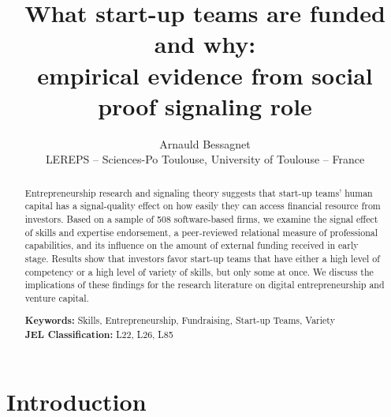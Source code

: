 \documentclass[12pt]{article}
\begin{document}
\title{What start-up teams are funded and why: \\ empirical evidence from social proof signaling role}
\date{\vspace{-3ex}}
\author{Arnauld Bessagnet \\ \footnotesize{LEREPS – Sciences-Po Toulouse, University of Toulouse – France} \\}

\maketitle \vspace{-1,5em}

\begin{abstract}
\noindent
Entrepreneurship research and signaling theory suggests that start-up teams' human capital has a signal-quality effect on how easily they can access financial resource from investors. Based on a sample of 508 software-based firms, we examine the signal effect of skills and expertise endorsement, a peer-reviewed relational measure of professional capabilities, and its influence on the amount of external funding received in early stage. Results show that investors favor start-up teams that have either a high level of competency or a high level of variety of skills, but only some at once. We discuss the implications of these findings for the research literature on digital entrepreneurship and venture capital. \newline

\begin{obeylines}
\noindent \footnotesize{}{\textbf{Keywords:} Skills, Entrepreneurship, Fundraising, Start-up Teams, Variety}
\noindent \footnotesize{\textbf{JEL Classification:} L22, L26, L85}
\end{obeylines}

\end{abstract}

\clearpage
\section{Introduction}


\end{document}
